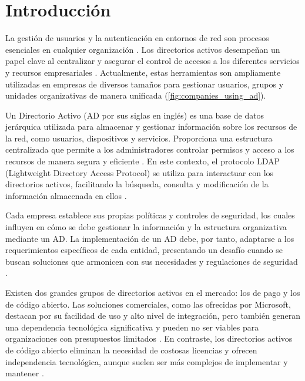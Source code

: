 \section*{Introducción}

La gestión de usuarios y la autenticación en entornos de red son procesos esenciales en cualquier organización \autocite{thakur_user_2015-1, josang_local_2015, kizza_access_2024}. Los directorios activos desempeñan un papel clave al centralizar y asegurar el control de accesos a los diferentes servicios y recursos empresariales \autocite{kizza_access_2024}. Actualmente, estas herramientas son ampliamente utilizadas en empresas de diversos tamaños para gestionar usuarios, grupos y unidades organizativas de manera unificada (\autoref{fig:companies_using_ad}).

Un Directorio Activo (AD por sus siglas en inglés) es una base de datos jerárquica utilizada para almacenar y gestionar información sobre los recursos de la red, como usuarios, dispositivos y servicios. Proporciona una estructura centralizada que permite a los administradores controlar permisos y acceso a los recursos de manera segura y eficiente  \autocite{harrison_lightweight_2006,thakur_user_2015,carter_ldap_2003}. En este contexto, el protocolo LDAP (Lightweight Directory Access Protocol) se utiliza para interactuar con los directorios activos, facilitando la búsqueda, consulta y modificación de la información almacenada en ellos \autocite{harrison_lightweight_2006,sermersheim_lightweight_2006,bartlett_samba_2005,voglmaier_abcs_2003,redhat_what_2022,janice_ldap_2023}.

Cada empresa establece sus propias políticas y controles de seguridad, los cuales influyen en cómo se debe gestionar la información y la estructura organizativa mediante un AD. La implementación de un AD debe, por tanto, adaptarse a los requerimientos específicos de cada entidad, presentando un desafío cuando se buscan soluciones que armonicen con sus necesidades y regulaciones de seguridad \autocite{kizza_access_2024,harrison_lightweight_2006,thakur_user_2015}.

Existen dos grandes grupos de directorios activos en el mercado: los de pago y los de código abierto. Las soluciones comerciales, como las ofrecidas por Microsoft, destacan por su facilidad de uso y alto nivel de integración, pero también generan una dependencia tecnológica significativa y pueden no ser viables para organizaciones con presupuestos limitados . En contraste, los directorios activos de código abierto eliminan la necesidad de costosas licencias y ofrecen independencia tecnológica, aunque suelen ser más complejos de implementar y mantener \autocite{thakur_user_2015-1,bartlett_samba_2005,imanudin_active_2019}.

